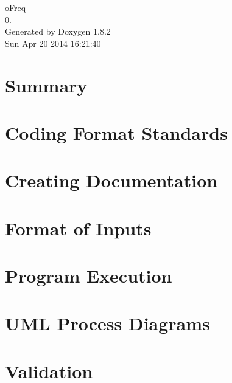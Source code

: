 \documentclass{book}
\begin{document}
\hypersetup{pageanchor=false,citecolor=blue}
\begin{titlepage}
\vspace*{7cm}
\begin{center}
{\Large o\-Freq \\[1ex]\large 0. }\\
\vspace*{1cm}
{\large Generated by Doxygen 1.8.2}\\
\vspace*{0.5cm}
{\small Sun Apr 20 2014 16:21:40}\\
\end{center}
\end{titlepage}
\clearemptydoublepage
{}
\tableofcontents
\clearemptydoublepage
{}
\hypersetup{pageanchor=true,citecolor=blue}
\chapter{Summary}
\label{index}\hypertarget{index}{}
\chapter{Coding Format Standards}
\label{coding_standard}
\hypertarget{coding_standard}{}

\chapter{Creating Documentation}
\label{documentation}
\hypertarget{documentation}{}

\chapter{Format of Inputs}
\label{input_format}
\hypertarget{input_format}{}

\chapter{Program Execution}
\label{program_execution}
\hypertarget{program_execution}{}

\chapter{U\-M\-L Process Diagrams}
\label{UML_Process}
\hypertarget{UML_Process}{}

\chapter{Validation}
\label{Validation}
\hypertarget{Validation}{}

\end{document}
